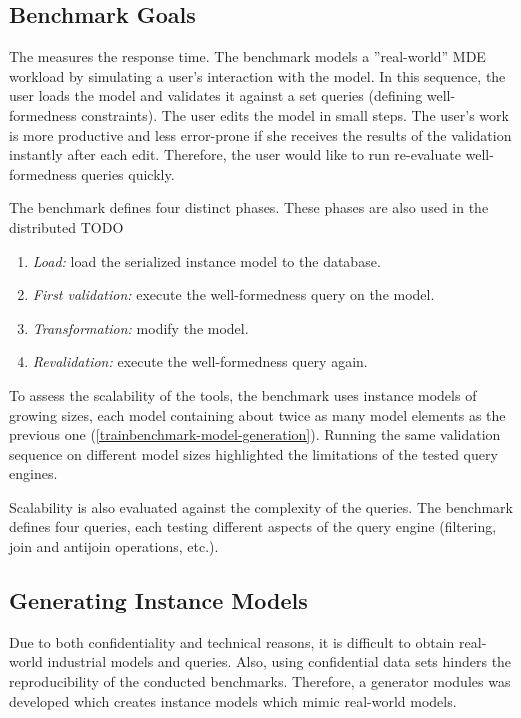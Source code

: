 \subsection{Benchmark Goals}

The \tb{} measures the response time. The benchmark models a ''real-world'' MDE workload by simulating a user's interaction with the model. In this sequence, the user loads the model and validates it against a set  queries (defining well-formedness constraints). The user edits the model in small steps. The user's work is more productive and less error-prone if she receives the results of the validation instantly after each edit. Therefore, the user would like to run re-evaluate well-formedness queries quickly.

The benchmark defines four distinct phases. These phases are also used in the distributed \tb{} TODO

\begin{enumerate}
  \item \emph{Load:} load the serialized instance model to the database.
  \item \emph{First validation:} execute the well-formedness query on the model.
  \item \emph{Transformation:} modify the model.
  \item \emph{Revalidation:} execute the well-formedness query again.
\end{enumerate}

To assess the scalability of the tools, the benchmark uses instance models of growing sizes, each model containing about twice as many model elements as the previous one (\autoref{trainbenchmark-model-generation}). Running the same validation sequence on different model sizes highlighted the limitations of the tested query engines.

Scalability is also evaluated against the complexity of the queries. The benchmark defines four queries, each testing different aspects of the query engine (filtering, join and antijoin operations, etc.).

\subsection{Generating Instance Models}
\label{trainbenchmark-model-generation}

Due to both confidentiality and technical reasons, it is difficult to obtain real-world industrial models and queries. Also, using confidential data sets hinders the reproducibility of the conducted benchmarks. Therefore, a generator modules was developed which creates instance models which mimic real-world models.

